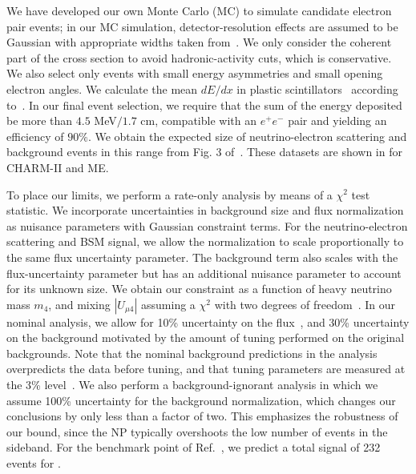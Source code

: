 We have developed our own Monte Carlo (MC) to simulate candidate electron pair events; in our MC simulation, detector-resolution effects are assumed to be Gaussian with appropriate widths taken from~\cite{Aliaga:2013uqz}. We only consider the coherent part of the cross section to avoid hadronic-activity cuts, which is conservative. We also select only events with small energy asymmetries and small opening electron angles. We calculate the mean $dE/dx$ in plastic scintillators~\cite{NIST:2018} according to~\cite{Leo:1987kd,Tanabashi:2018oca}. 
In our final event selection, we require that the sum of the energy deposited be more than $4.5$ MeV$/ 1.7$ cm, compatible with an $e^+e^-$ pair and yielding an efficiency of $90\%$. We obtain the expected size of neutrino-electron scattering and background events in this range from Fig. 3 of~\cite{Park:2015eqa}. These datasets are shown in  for CHARM-II and \minerva ME.

To place our limits, we perform a rate-only analysis by means of a $\chi^2$ test statistic. We incorporate uncertainties in background size and flux normalization as nuisance parameters with Gaussian constraint terms. For the neutrino-electron scattering and BSM signal, we allow the normalization to scale proportionally to the same flux uncertainty parameter. 
The background term also scales with the flux-uncertainty parameter but has an additional nuisance parameter to account for its unknown size. We obtain our constraint as a function of heavy neutrino mass $m_4$, and mixing $|U_{\mu 4}|$ assuming a $\chi^2$ with two degrees of freedom~\cite{Tanabashi:2018oca}.
In our nominal \minerva analysis, we allow for 10\% uncertainty on the flux~\cite{Aliaga:2016oaz}, and 30\% uncertainty on the background motivated by the amount of tuning performed on the original backgrounds. Note that the nominal background predictions in the \minerva analysis overpredicts the data before tuning, and that tuning parameters are measured at the 3\% level~\cite{Park:2013dax}.
We also perform a background-ignorant analysis in which we assume 100\% uncertainty for the background normalization, which changes our conclusions by only less than a factor of two. This emphasizes the robustness of our \minerva bound, since the NP typically overshoots the low number of events in the sideband. For the benchmark point of Ref.~\cite{Bertuzzo:2018itn}, we predict a total signal of 232 events for \minerva.


